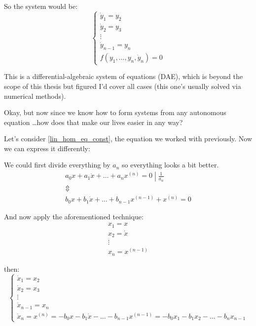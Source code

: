 So the system would be:
\[
	\begin{cases}
		\dot{y}_1 = y_2     \\
		\dot{y}_2 = y_3     \\
		\vdots              \\
		\dot{y}_{n-1} = y_n \\
		f(y_1,\dots,y_n,\dot{y}_n) = 0
	\end{cases}
\]

This is a differential-algebraic system of equations (DAE), which is beyond the scope of this thesis but figured I'd cover all cases (this one's usually solved via numerical methods).

Okay, but now since we know how to form systems from any autonomous equation \dots how does that make our lives easier in any way?

Let's consider \ref{lin_hom_eq_const}, the equation we worked with previously. Now we can express it differently:

We could first divide everything by $a_{n}$ so everything looks a bit better.
\begin{gather*}
	\left. a_0 x + a_1\dot{x}+ \dots +a_{n} x^{(n)} = 0 \middle| \frac{1}{a_{n}} \right. \\
	\Updownarrow \\
	b_0 x + b_1\dot{x} + \dots + b_{n-1} x^{(n-1)} + x^{(n)} = 0
\end{gather*}

And now apply the aforementioned technique:
\begin{gather*}
	x_1 = x     \\
	x_2 = \dot{x} \\
	\vdots \\
	x_n = x^{(n-1)}
\end{gather*}

then:
\[
	\begin{cases}
		\dot{x}_1 = x_2     \\
		\dot{x}_2 = x_3     \\
		\vdots              \\
		\dot{x}_{n-1} = x_n \\
		\dot{x}_n  = x^{(n)} = -b_0x - b_1\dot{x} - \dots - b_{n-1} x^{(n-1)} = -b_0 x_1 - b_1 x_2 - \dots - b_n x_{n-1}
	\end{cases}
\]

